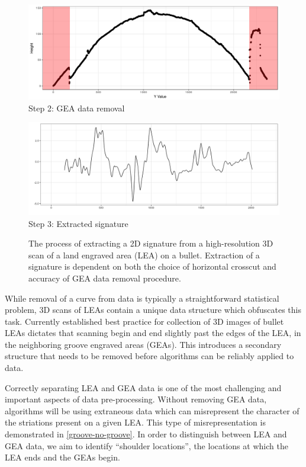 \documentclass[12pt]{article}
\begin{document}
\begin{figure}
\begin{minipage}[b]{0.45\linewidth}
    \raggedleft
    \includegraphics[width=\textwidth]{../images/Profile_1_red_grooves.png}
    \centering
    Step 2: GEA data removal
\end{minipage}
\hspace{.2cm}
\begin{minipage}[b]{0.45\linewidth}
    \raggedright
    \includegraphics[width=\textwidth]{../images/signature.png}
    \centering
    Step 3: Extracted signature
\end{minipage}
\caption{The process of extracting a 2D signature from a high-resolution 3D scan of a land engraved area (LEA) on a bullet. Extraction of a signature is dependent on both the choice of horizontal crosscut and accuracy of GEA data removal procedure.}  
\label{processing-process}
\end{figure}

While removal of a curve from data is typically a straightforward
statistical problem, 3D scans of LEAs contain a unique data structure
which obfuscates this task. Currently established best practice for
collection of 3D images of bullet LEAs dictates that scanning begin and
end slightly past the edges of the LEA, in the neighboring groove
engraved areas (GEAs). This introduces a secondary structure that needs
to be removed before algorithms can be reliably applied to data.

Correctly separating LEA and GEA data is one of the most challenging and
important aspects of data pre-processing. Without removing GEA data,
algorithms will be using extraneous data which can misrepresent the
character of the striations present on a given LEA. This type of
misrepresentation is demonstrated in \autoref{groove-no-groove}. In
order to distinguish between LEA and GEA data, we aim to identify
``shoulder locations'', the locations at which the LEA ends and the GEAs
begin.
\end{document}
